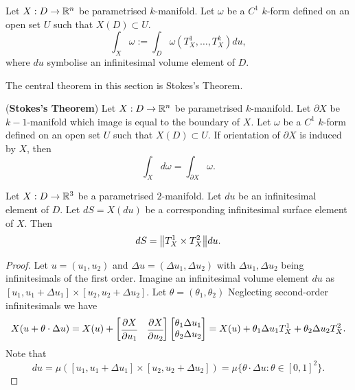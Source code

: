\documentclass[main.tex]{subfiles}
\begin{document}
\begin{definition}
Let $X: D\to \mathbb{R}^n$ be parametrised $k$-manifold. Let $\omega$ be a $C^1$ $k$-form defined on an open set $U$ such that $X(D)\subset U$.
\begin{equation}
\int_X \omega := \int_D \omega(T_X^1, \dots, T_X^k)du,
\end{equation}
where $du$ symbolise an infinitesimal volume element of $D$.  
\end{definition}
The central theorem in this section is Stokes's Theorem.
\begin{theorem}(\textbf{Stokes's Theorem})
\label{par-manifold-stokes}
Let $X: D\to \mathbb{R}^n$ be parametrised $k$-manifold. Let $\partial X$ be $k-1$-manifold which image is equal to the boundary of $X$. Let $\omega$ be a $C^1$ $k$-form defined on an open set $U$ such that $X(D)\subset U$. If orientation of $\partial X$ is induced by $X$, then
\begin{equation}
\int_{X} d\omega = \int_{\partial X} \omega.
\end{equation}
\begin{lemma}
\label{surface-element}
Let $X:D\to\mathbb{R}^3$ be a parametrised $2$-manifold. Let $du$ be an infinitesimal element of $D$. Let $dS = X(du)$ be a corresponding infinitesimal surface element of $X$. Then
\begin{equation}
dS = \norm{T^1_X\times T^2_X}du.
\end{equation}
\end{lemma}
\begin{proof}
Let $u = (u_1, u_2)$ and $\Delta u = (\Delta u_1, \Delta u_2)$ with $\Delta u_1, \Delta u_2$ being infinitesimals of the first order. Imagine an infinitesimal volume element $du$ as $[u_1, u_1 + \Delta u_1]\times [u_2, u_2 + \Delta u_2]$. Let $\theta = (\theta_1, \theta_2)$ Neglecting second-order infinitesimals we have
\begin{equation}
X(u + \theta\cdot\Delta u) = X(u) + 
\begin{bmatrix}
\cfrac{\partial X}{\partial u_1} & \cfrac{\partial X}{\partial u_2}
\end{bmatrix}
\begin{bmatrix}
\theta_1\Delta u_1 \\
\theta_2\Delta u_2
\end{bmatrix} 
= X(u) + \theta_1\Delta u_1 T_X^1 + \theta_2\Delta u_2 T_X^2.
\end{equation}
Note that
\begin{equation}
du = \mu([u_1, u_1 + \Delta u_1]\times [u_2, u_2 + \Delta u_2]) = \mu\{\theta\cdot\Delta u:\theta\in[0,1]^2\}.

\end{equation}
\end{proof}
\end{theorem}
\end{document}

